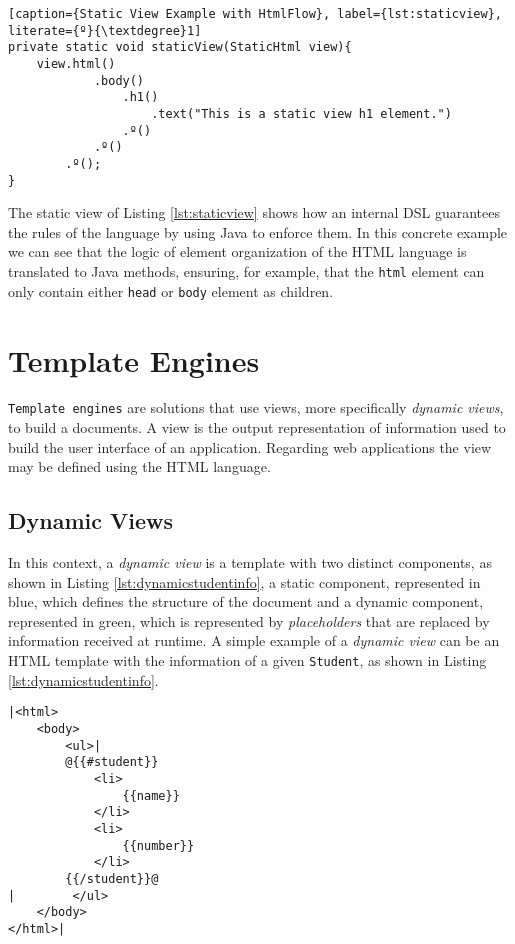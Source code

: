 \begin{minipage}{\linewidth}
\begin{lstlisting}[caption={Static View Example with HtmlFlow}, label={lst:staticview}, literate={º}{\textdegree}1]
private static void staticView(StaticHtml view){
    view.html()
            .body()
                .h1()
                    .text("This is a static view h1 element.")
                .º()
            .º()
        .º();
}
\end{lstlisting}
\end{minipage} 

\noindent
The static view of Listing \ref{lst:staticview} shows how an internal \ac{DSL} guarantees the rules of the language by using Java to enforce them. In this concrete example we can see that the logic of element organization of the \ac{HTML} language is translated to Java methods, ensuring, for example, that the \texttt{html} element can only contain either \texttt{head} or \texttt{body} element as children.

\section{Template Engines}
\label{sec:templateengines}

\texttt{Template engines} are solutions that use views, more specifically \textit{dynamic views}, to build a documents. A view is the output representation of information used to build the user interface of an application. Regarding web applications the view may be defined using the \ac{HTML} language.

\subsection{Dynamic Views}

In this context, a \textit{dynamic view} is a template with two distinct components, as shown in Listing \ref{lst:dynamicstudentinfo}, a {\color{blue}static component}, represented in blue, which defines the structure of the document and a {\color{green}dynamic component}, represented in green, which is represented by \textit{placeholders} that are replaced by information received at runtime. A simple example of a \textit{dynamic view} can be an \ac{HTML} template with the information of a given \texttt{Student}, as shown in Listing \ref{lst:dynamicstudentinfo}. 

\bigskip

\begin{minipage}{\linewidth}
\begin{lstlisting}[caption={HTML Template of Student information in Mustache idiom}, label={lst:dynamicstudentinfo}, style=dynamicviewsex]
|<html>
    <body>
        <ul>|
        @{{#student}}
            <li>
                {{name}}
            </li>
            <li>
                {{number}}
            </li>
        {{/student}}@
|        </ul>
    </body>
</html>|
\end{lstlisting}
\end{minipage} 

